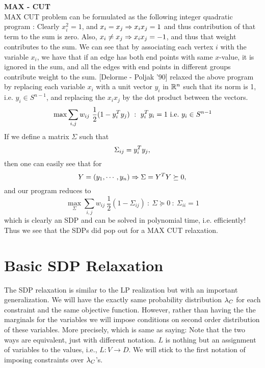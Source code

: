 \begin{example}{\bf MAX - CUT}\label{maxcut}\\
MAX CUT problem can be formulated as the following integer quadratic program : 
Clearly $x_i^2=1$, and $x_i=x_j\Rightarrow x_ix_j=1$ and thus contribution of that term to the sum is zero. 
Also, $x_i \neq x_j \Rightarrow x_ix_j=-1$, and thus that weight contributes to the sum. 
We can see that by associating each vertex $i$ with the variable $x_i$, we have that if an edge has both end points with same $x$-value, it is ignored in the sum, and all the edges with end points in different groups contribute weight to the sum. 
[Delorme - Poljak '90] relaxed the above program by replacing each variable $x_i$ with a unit vector $y_i$ in $\mathbb{R}^n$ such that its norm is 1, i.e. $y_i \in S^{n-1}$, and replacing the $x_ix_j$ by the dot product between the vectors. 
\[ \max \sum_{i,j} w_{ij} \ \frac{1}{2}(1-y_i^T y_j) ~:~ y_i^T y_i = 1 {\mbox {\ i.e.\ }} y_i \in S^{n-1} \]
If we define a matrix $\Sigma$ such that $$\Sigma_{ij} = y_i^T y_j,$$ then one can easily see that for $$Y = (y_1, \cdots, y_n) \Rightarrow \Sigma = Y^T Y \succeq 0,$$ and our program reduces to 
\[ \max_\Sigma \sum_{i,j} w_{ij} \ \frac{1}{2}(1-\Sigma_{ij}) ~:~ \Sigma \succeq 0 ~:~ \Sigma_{ii} = 1  \]
which is clearly an SDP and can be solved in polynomial time, i.e. efficiently! 
Thus we see that the SDPs did pop out for a MAX CUT relaxation.
\end{example}

\section{Basic SDP Relaxation}

The SDP relaxation is similar to the LP realization but with an important generalization. 
We will have the exactly same probability distribution $\lambda_C$ for each constraint and the same objective function. 
However, rather than having the the marginals for the variables we will impose conditions on second order distribution of these variables. 
More precisely,
which is same as saying: 
Note that the two ways are equivalent, just with different notation. 
$L$ is nothing but an assignment of variables to the values, i.e., $L : V \rightarrow D$. 
We will stick to the first notation of imposing constraints over $\lambda_C$'s. 


